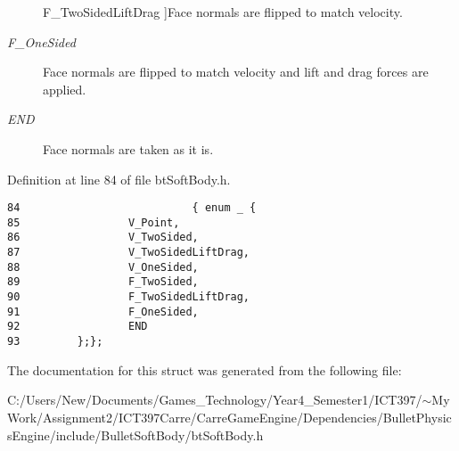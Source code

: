 \begin{Desc}
\begin{description}
{\hypertarget{structbt_soft_body_1_1e_aero_model_147f4e50f7cfaa2855b5ea5b4b2986aebf0ee1be501b9fc3aafd6055c2a54c48}{
F\_\-TwoSidedLiftDrag}
\label{structbt_soft_body_1_1e_aero_model_147f4e50f7cfaa2855b5ea5b4b2986aebf0ee1be501b9fc3aafd6055c2a54c48}
}]Face normals are flipped to match velocity. \item[{\em 
\hypertarget{structbt_soft_body_1_1e_aero_model_147f4e50f7cfaa2855b5ea5b4b2986ae975eb119297b6320316ed0cac16db8e3}{
F\_\-OneSided}
\label{structbt_soft_body_1_1e_aero_model_147f4e50f7cfaa2855b5ea5b4b2986ae975eb119297b6320316ed0cac16db8e3}
}]Face normals are flipped to match velocity and lift and drag forces are applied. \item[{\em 
\hypertarget{structbt_soft_body_1_1e_aero_model_147f4e50f7cfaa2855b5ea5b4b2986ae4b021d138b17f22f5e8fab9a253779f2}{
END}
\label{structbt_soft_body_1_1e_aero_model_147f4e50f7cfaa2855b5ea5b4b2986ae4b021d138b17f22f5e8fab9a253779f2}
}]Face normals are taken as it is. \end{description}
\end{Desc}



Definition at line 84 of file btSoftBody.h.

\begin{Code}\begin{verbatim}84                           { enum _ {
85                 V_Point,                        
86                 V_TwoSided,                     
87                 V_TwoSidedLiftDrag, 
88                 V_OneSided,                     
89                 F_TwoSided,                     
90                 F_TwoSidedLiftDrag,     
91                 F_OneSided,                     
92                 END
93         };};
\end{verbatim}
\end{Code}




The documentation for this struct was generated from the following file:\begin{CompactItemize}
\item 
C:/Users/New/Documents/Games\_\-Technology/Year4\_\-Semester1/ICT397/$\sim$My Work/Assignment2/ICT397Carre/CarreGameEngine/Dependencies/BulletPhysicsEngine/include/BulletSoftBody/btSoftBody.h\end{CompactItemize}

